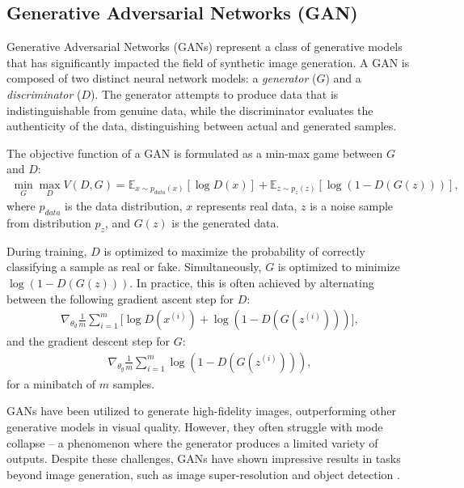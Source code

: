 \documentclass[11pt,a4paper,oneside]{report}
\begin{document}
\subsection{Generative Adversarial Networks (GAN)}

Generative Adversarial Networks (GANs) represent a class of generative models that has significantly impacted the field of synthetic image generation. A GAN is composed of two distinct neural network models: a \textit{generator} ($G$) and a \textit{discriminator} ($D$). The generator attempts to produce data that is indistinguishable from genuine data, while the discriminator evaluates the authenticity of the data, distinguishing between actual and generated samples.

The objective function of a GAN is formulated as a min-max game between $G$ and $D$:
\begin{align}
\min_{G} \max_{D} V(D, G) = \mathbb{E}_{x\sim p_{data}(x)}[\log D(x)] + \mathbb{E}_{z\sim p_{z}(z)}[\log (1 - D(G(z)))],
\end{align}
where $p_{data}$ is the data distribution, $x$ represents real data, $z$ is a noise sample from distribution $p_z$, and $G(z)$ is the generated data.

During training, $D$ is optimized to maximize the probability of correctly classifying a sample as real or fake. Simultaneously, $G$ is optimized to minimize $\log(1 - D(G(z)))$. In practice, this is often achieved by alternating between the following gradient ascent step for $D$:
\begin{align}
\nabla_{\theta_d} \frac{1}{m} \sum_{i=1}^{m} \Big[ \log D(x^{(i)}) + \log (1 - D(G(z^{(i)}))) \Big],
\end{align}
and the gradient descent step for $G$:
\begin{align}
\nabla_{\theta_g} \frac{1}{m} \sum_{i=1}^{m} \log (1 - D(G(z^{(i)}))),
\end{align}
for a minibatch of $m$ samples.

GANs have been utilized to generate high-fidelity images, outperforming other generative models in visual quality. However, they often struggle with mode collapse -- a phenomenon where the generator produces a limited variety of outputs. Despite these challenges, GANs have shown impressive results in tasks beyond image generation, such as image super-resolution \cite{denton2015deep}and object detection \cite{goodfellow2014generative}.
\end{document}
